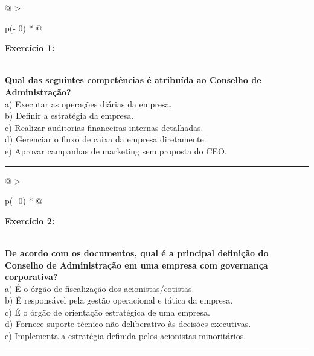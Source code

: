 \documentclass[
]{book}
\begin{document}
\begin{longtable}[]{@{}
  >{\raggedright\arraybackslash}p{(\columnwidth - 0\tabcolsep) * }@{}}
\toprule\noalign{}
\begin{minipage}[b]{\linewidth}\raggedright
\textbf{Exercício 1:}
\end{minipage} \\
\midrule\noalign{}
\endhead
\bottomrule\noalign{}
\endlastfoot
\textbf{Qual das seguintes competências é atribuída ao Conselho de Administração?} \\
a) Executar as operações diárias da empresa. \\
b) Definir a estratégia da empresa. \\
c) Realizar auditorias financeiras internas detalhadas. \\
d) Gerenciar o fluxo de caixa da empresa diretamente. \\
e) Aprovar campanhas de marketing sem proposta do CEO. \\
\end{longtable}

\begin{center}\rule{0.5\linewidth}{0.5pt}\end{center}

\begin{longtable}[]{@{}
  >{\raggedright\arraybackslash}p{(\columnwidth - 0\tabcolsep) * }@{}}
\toprule\noalign{}
\begin{minipage}[b]{\linewidth}\raggedright
\textbf{Exercício 2:}
\end{minipage} \\
\midrule\noalign{}
\endhead
\bottomrule\noalign{}
\endlastfoot
\textbf{De acordo com os documentos, qual é a principal definição do Conselho de Administração em uma empresa com governança corporativa?} \\
a) É o órgão de fiscalização dos acionistas/cotistas. \\
b) É responsável pela gestão operacional e tática da empresa. \\
c) É o órgão de orientação estratégica de uma empresa. \\
d) Fornece suporte técnico não deliberativo às decisões executivas. \\
e) Implementa a estratégia definida pelos acionistas minoritários. \\
\end{longtable}

\begin{center}\rule{0.5\linewidth}{0.5pt}\end{center}
\end{document}
